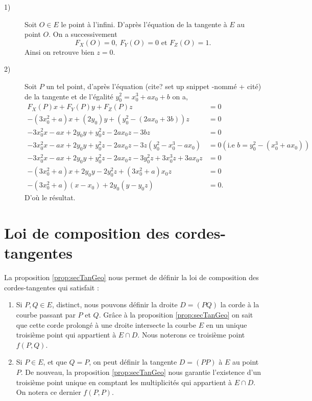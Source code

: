 \begin{demonstration}
    \begin{description}
        \item[1)] Soit  $O \in E$ le point à l'infini. D'après l'équation de la tangente à $E$ au point $O$. On a successivement 
            \[
            F_{X}(O) = 0, \ F_{Y}(O) = 0 \text{ et } F_{Z}(O) = 1
            .\] 
            Ainsi on retrouve bien $z = 0$.

        \item[2)] Soit $P$ un tel point, d'après l'équation (cite? set up snippet -nommé + cité) de la tangente et de l'égalité $y_0^2 = x_0^3 + ax_0 + b$ on a,
            \begin{align*}
                F_{X}(P)x + F_{Y}(P)y + F_{Z}(P)z &= 0 \\
                - \left( 3x_0^2 + a \right)x + \left( 2y_0 \right)y + \left( y_0^2 - \left( 2ax_0 + 3b \right) \right)z &= 0 \\
                - 3x_0^2x - ax + 2y_0y + y_0^2z - 2ax_0z - 3bz &= 0 \\ 
                - 3x_0^2x - ax + 2y_0y + y_0^2z - 2ax_0z - 3z\left( y_0^2 - x_0^3 - ax_0 \right) &= 0 \left( \text{i.e } b = y_0^2 - \left( x_0^3 + ax_0 \right) \right) \\
                - 3x_0^2x -ax + 2y_0y + y_0^2z - 2ax_0z - 3y_0^2z + 3x_0^3z + 3ax_0z &= 0 \\
                - \left( 3x_0^2 + a \right)x + 2y_0y - 2y_0^2z + \left( 3x_0^2 + a \right)x_0z &= 0\\
                - \left( 3x_0^2 + a \right)\left( x - x_0 \right) + 2y_0\left( y - y_0z \right) &= 0
            .\end{align*}
            D'où le résultat.
    \end{description}
    
\end{demonstration}


\section{Loi de composition des cordes-tangentes}

La proposition \ref{prop:secTanGeo} nous permet de définir la loi de composition des
cordes-tangentes qui satisfait :

\begin{enumerate}
    \item Si $P,Q \in E$, distinct, nous pouvons définir la droite $D = (PQ)$ la corde
        à la courbe passant par $P$ et $Q$. Grâce à la proposition \ref{prop:secTanGeo} on sait
        que cette corde prolongé à une droite intersecte la courbe $E$ en un unique troisième
        point qui appartient à $E \cap D$. Nous noterons ce troisième point $f(P,Q)$.
    \item Si $P \in E$, et que $Q=P$, on peut définir la tangente $D = (PP)$ à $E$ au point
        $P$. De nouveau, la proposition \ref{prop:secTanGeo} nous garantie l'existence d'un
        troisième point unique en comptant les multiplicités qui appartient à $E \cap D$. On
        notera ce dernier $f(P,P)$.
\end{enumerate}

